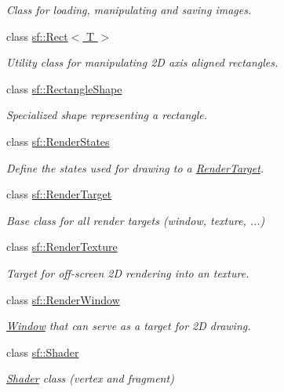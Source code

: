\begin{DoxyCompactItemize}
\begin{DoxyCompactList}\small\item\em Class for loading, manipulating and saving images. \end{DoxyCompactList}\item 
class \hyperlink{classsf_1_1_rect}{sf\-::\-Rect$<$ T $>$}
\begin{DoxyCompactList}\small\item\em Utility class for manipulating 2\-D axis aligned rectangles. \end{DoxyCompactList}\item 
class \hyperlink{classsf_1_1_rectangle_shape}{sf\-::\-Rectangle\-Shape}
\begin{DoxyCompactList}\small\item\em Specialized shape representing a rectangle. \end{DoxyCompactList}\item 
class \hyperlink{classsf_1_1_render_states}{sf\-::\-Render\-States}
\begin{DoxyCompactList}\small\item\em Define the states used for drawing to a \hyperlink{classsf_1_1_render_target}{Render\-Target}. \end{DoxyCompactList}\item 
class \hyperlink{classsf_1_1_render_target}{sf\-::\-Render\-Target}
\begin{DoxyCompactList}\small\item\em Base class for all render targets (window, texture, ...) \end{DoxyCompactList}\item 
class \hyperlink{classsf_1_1_render_texture}{sf\-::\-Render\-Texture}
\begin{DoxyCompactList}\small\item\em Target for off-\/screen 2\-D rendering into an texture. \end{DoxyCompactList}\item 
class \hyperlink{classsf_1_1_render_window}{sf\-::\-Render\-Window}
\begin{DoxyCompactList}\small\item\em \hyperlink{classsf_1_1_window}{Window} that can serve as a target for 2\-D drawing. \end{DoxyCompactList}\item 
class \hyperlink{classsf_1_1_shader}{sf\-::\-Shader}
\begin{DoxyCompactList}\small\item\em \hyperlink{classsf_1_1_shader}{Shader} class (vertex and fragment) \end{DoxyCompactList}\item 

\end{DoxyCompactItemize}
